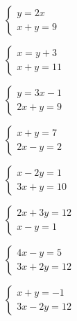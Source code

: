 \documentclass[12pt]{article}
\begin{document}
\begin{exercicios}
  \item $\begin{cases} y = 2x \\ x + y = 9 \end{cases}$
  \item $\begin{cases} x = y + 3 \\ x + y = 11 \end{cases}$
  \item $\begin{cases} y = 3x - 1 \\ 2x + y = 9 \end{cases}$
  \item $\begin{cases} x + y = 7 \\ 2x - y = 2 \end{cases}$
  \item $\begin{cases} x - 2y = 1 \\ 3x + y = 10 \end{cases}$
  \item $\begin{cases} 2x + 3y = 12 \\ x - y = 1 \end{cases}$
  \item $\begin{cases} 4x - y = 5 \\ 3x + 2y = 12 \end{cases}$
  \item $\begin{cases} x + y = -1 \\ 3x - 2y = 12 \end{cases}$
\end{exercicios}
\end{document}
